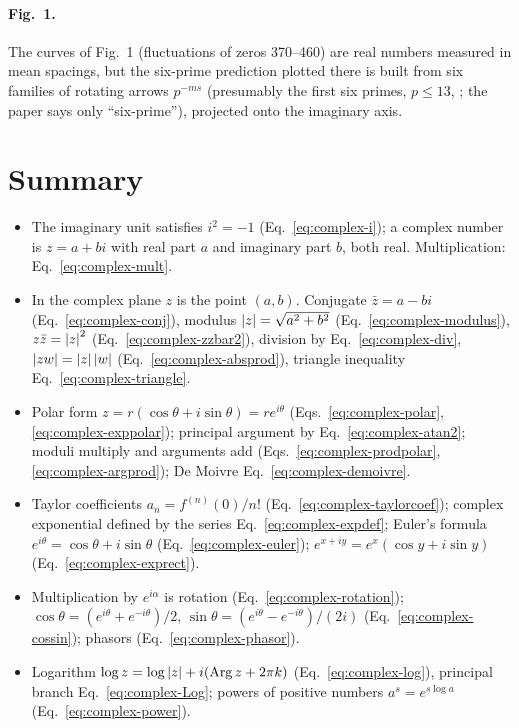 \paragraph{Fig.~1.} The curves of Fig.~1 (fluctuations of zeros 370--460) are real numbers measured in mean spacings, but the six-prime prediction plotted there is built from six families of rotating arrows $p^{-ms}$ (presumably the first six primes, $p\le13$, ; the paper says only ``six-prime''), projected onto the imaginary axis.

\section{Summary}

\begin{itemize}
\item The imaginary unit satisfies $i^2=-1$ (Eq.~\eqref{eq:complex-i}); a complex number is $z=a+bi$ with real part $a$ and imaginary part $b$, both real. Multiplication: Eq.~\eqref{eq:complex-mult}.
\item In the complex plane $z$ is the point $(a,b)$. Conjugate $\bar z=a-bi$ (Eq.~\eqref{eq:complex-conj}), modulus $\left\lvert z\right\rvert=\sqrt{a^2+b^2}$ (Eq.~\eqref{eq:complex-modulus}), $z\bar z=\left\lvert z\right\rvert^2$ (Eq.~\eqref{eq:complex-zzbar2}), division by Eq.~\eqref{eq:complex-div}, $\left\lvert zw\right\rvert=\left\lvert z\right\rvert\left\lvert w\right\rvert$ (Eq.~\eqref{eq:complex-absprod}), triangle inequality Eq.~\eqref{eq:complex-triangle}.
\item Polar form $z=r(\cos\theta+i\sin\theta)=re^{i\theta}$ (Eqs.~\eqref{eq:complex-polar}, \eqref{eq:complex-exppolar}); principal argument by Eq.~\eqref{eq:complex-atan2}; moduli multiply and arguments add (Eqs.~\eqref{eq:complex-prodpolar}, \eqref{eq:complex-argprod}); De Moivre Eq.~\eqref{eq:complex-demoivre}.
\item Taylor coefficients $a_n=f^{(n)}(0)/n!$ (Eq.~\eqref{eq:complex-taylorcoef}); complex exponential defined by the series Eq.~\eqref{eq:complex-expdef}; Euler's formula $e^{i\theta}=\cos\theta+i\sin\theta$ (Eq.~\eqref{eq:complex-euler}); $e^{x+iy}=e^x(\cos y+i\sin y)$ (Eq.~\eqref{eq:complex-exprect}).
\item Multiplication by $e^{i\alpha}$ is rotation (Eq.~\eqref{eq:complex-rotation}); $\cos\theta=(e^{i\theta}+e^{-i\theta})/2$, $\sin\theta=(e^{i\theta}-e^{-i\theta})/(2i)$ (Eq.~\eqref{eq:complex-cossin}); phasors (Eq.~\eqref{eq:complex-phasor}).
\item Logarithm $\log z=\log\left\lvert z\right\rvert+i(\operatorname{Arg}z+2\pi k)$ (Eq.~\eqref{eq:complex-log}), principal branch Eq.~\eqref{eq:complex-Log}; powers of positive numbers $a^s=e^{s\log a}$ (Eq.~\eqref{eq:complex-power}).

\end{itemize}
